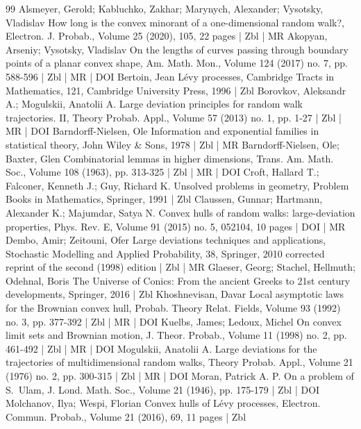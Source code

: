 \begin{thebibliography}{99}
Alsmeyer, Gerold; Kabluchko, Zakhar; Marynych, Alexander; Vysotsky, Vladislav How long is the convex minorant of a one-dimensional random walk?, Electron. J. Probab., Volume 25 (2020), 105, 22 pages | Zbl | MR
Akopyan, Arseniy; Vysotsky, Vladislav On the lengths of curves passing through boundary points of a planar convex shape, Am. Math. Mon., Volume 124 (2017) no. 7, pp. 588-596 | Zbl | MR | DOI
Bertoin, Jean Lévy processes, Cambridge Tracts in Mathematics, 121, Cambridge University Press, 1996 | Zbl
Borovkov, Aleksandr A.; Mogulskii, Anatolii A. Large deviation principles for random walk trajectories. II, Theory Probab. Appl., Volume 57 (2013) no. 1, pp. 1-27 | Zbl | MR | DOI
Barndorff-Nielsen, Ole Information and exponential families in statistical theory, John Wiley \& Sons, 1978 | Zbl | MR
Barndorff-Nielsen, Ole; Baxter, Glen Combinatorial lemmas in higher dimensions, Trans. Am. Math. Soc., Volume 108 (1963), pp. 313-325 | Zbl | MR | DOI
Croft, Hallard T.; Falconer, Kenneth J.; Guy, Richard K. Unsolved problems in geometry, Problem Books in Mathematics, Springer, 1991 | Zbl
Claussen, Gunnar; Hartmann, Alexander K.; Majumdar, Satya N. Convex hulls of random walks: large-deviation properties, Phys. Rev. E, Volume 91 (2015) no. 5, 052104, 10 pages | DOI | MR
Dembo, Amir; Zeitouni, Ofer Large deviations techniques and applications, Stochastic Modelling and Applied Probability, 38, Springer, 2010 corrected reprint of the second (1998) edition | Zbl | MR
Glaeser, Georg; Stachel, Hellmuth; Odehnal, Boris The Universe of Conics: From the ancient Greeks to 21st century developments, Springer, 2016 | Zbl
Khoshnevisan, Davar Local asymptotic laws for the Brownian convex hull, Probab. Theory Relat. Fields, Volume 93 (1992) no. 3, pp. 377-392 | Zbl | MR | DOI
Kuelbs, James; Ledoux, Michel On convex limit sets and Brownian motion, J. Theor. Probab., Volume 11 (1998) no. 2, pp. 461-492 | Zbl | MR | DOI
Mogulskii, Anatolii A. Large deviations for the trajectories of multidimensional random walks, Theory Probab. Appl., Volume 21 (1976) no. 2, pp. 300-315 | Zbl | MR | DOI
Moran, Patrick A. P. On a problem of S. Ulam, J. Lond. Math. Soc., Volume 21 (1946), pp. 175-179 | Zbl | DOI
Molchanov, Ilya; Wespi, Florian Convex hulls of Lévy processes, Electron. Commun. Probab., Volume 21 (2016), 69, 11 pages | Zbl

\end{thebibliography}
